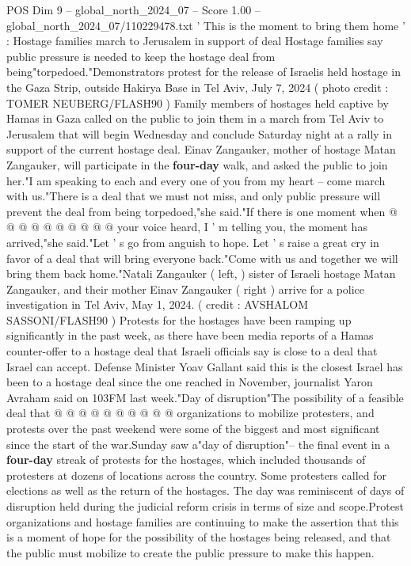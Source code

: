 \begin{textsample}{POS Dim 9 – global\_north\_2024\_07 – Score 1.00 – global\_north\_2024\_07/110229478.txt}  \label{ex:f9_pos_313}
' This is the moment to bring them home ' : Hostage families march to Jerusalem in support of deal Hostage families say public pressure is needed to keep the hostage deal from being"torpedoed."Demonstrators protest for the release of Israelis held hostage in the Gaza Strip, outside Hakirya Base in Tel Aviv, July 7, 2024 ( photo credit : TOMER NEUBERG/FLASH90 ) Family members of hostages held captive by Hamas in Gaza called on the public to join them in a march from Tel Aviv to Jerusalem that will begin Wednesday and conclude Saturday night at a rally in support of the current hostage deal.
Einav Zangauker, mother of hostage Matan Zangauker, will participate in the \textbf{four-day} walk, and asked the public to join her."I am speaking to each and every one of you from my heart -- come march with us."There is a deal that we must not miss, and only public pressure will prevent the deal from being torpedoed,"she said."If there is one moment when @ @ @ @ @ @ @ @ @ @ your voice heard, I ' m telling you, the moment has arrived,"she said."Let ' s go from anguish to hope.
Let ' s raise a great cry in favor of a deal that will bring everyone back."Come with us and together we will bring them back home."Natali Zangauker ( left, ) sister of Israeli hostage Matan Zangauker, and their mother Einav Zangauker ( right ) arrive for a police investigation in Tel Aviv, May 1, 2024. ( credit : AVSHALOM SASSONI/FLASH90 ) Protests for the hostages have been ramping up significantly in the past week, as there have been media reports of a Hamas counter-offer to a hostage deal that Israeli officials say is close to a deal that Israel can accept.
Defense Minister Yoav Gallant said this is the closest Israel has been to a hostage deal since the one reached in November, journalist Yaron Avraham said on 103FM last week."Day of disruption"The possibility of a feasible deal that @ @ @ @ @ @ @ @ @ @ organizations to mobilize protesters, and protests over the past weekend were some of the biggest and most significant since the start of the war.Sunday saw a"day of disruption"-- the final event in a \textbf{four-day} streak of protests for the hostages, which included thousands of protesters at dozens of locations across the country.
Some protesters called for elections as well as the return of the hostages.
The day was reminiscent of days of disruption held during the judicial reform crisis in terms of size and scope.Protest organizations and hostage families are continuing to make the assertion that this is a moment of hope for the possibility of the hostages being released, and that the public must mobilize to create the public pressure to make this happen.

\end{textsample}
